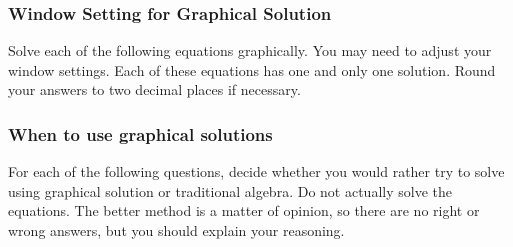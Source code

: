 \subsubsection*{Window Setting for Graphical Solution}

Solve each of the following equations graphically. You may need to adjust your window settings.  Each of these equations has one and only one solution. Round your answers to two decimal places if necessary.

\bigskip
{} 

\bigskip
{}

\bigskip
{} 

\bigskip
{}

\bigskip
{} 

\bigskip
{}

\bigskip
{} 

\bigskip
{}

\bigskip
{} 

\bigskip
{}

\bigskip
{} 

\bigskip
{}

\subsubsection*{When to use graphical solutions}

For each of the following questions, decide whether you would rather try to solve using graphical solution or traditional algebra. Do not actually solve the equations. The better method is a matter of opinion, so there are no right or wrong answers, but you should explain your reasoning.

\bigskip
{} 

\bigskip
{}

\bigskip
{} 

\bigskip
{}

\bigskip
{} 

